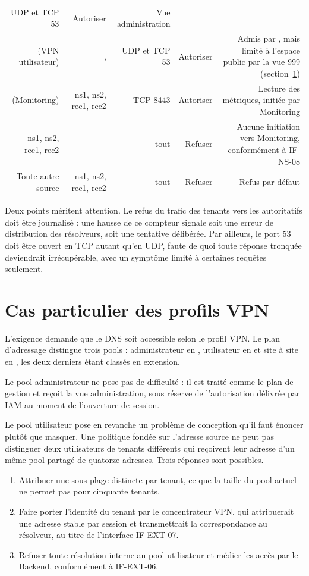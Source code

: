 \begin{longtable}{@{}R{0.26}R{0.19}R{0.14}R{0.13}R{0.28}@{}}
  UDP et TCP 53 & Autoriser & Vue administration\\
 (VPN utilisateur) & ,  &
  UDP et TCP 53 & Autoriser &
  Admis par , mais limité à l'espace public par la vue 999
  (section~\ref{sec:vpn})\\
 (Monitoring) & ns1, ns2, rec1, rec2 & TCP 8443 & Autoriser &
  Lecture des métriques, initiée par Monitoring\\
ns1, ns2, rec1, rec2 &  & tout & Refuser &
  Aucune initiation vers Monitoring, conformément à IF-NS-08\\
Toute autre source & ns1, ns2, rec1, rec2 & tout & Refuser &
  Refus par défaut\\
\end{longtable}

Deux points méritent attention. Le refus du trafic des tenants vers les
autoritatifs doit être journalisé : une hausse de ce compteur signale soit une
erreur de distribution des résolveurs, soit une tentative délibérée. Par
ailleurs, le port 53 doit être ouvert en TCP autant qu'en UDP, faute de quoi
toute réponse tronquée deviendrait irrécupérable, avec un symptôme limité à
certaines requêtes seulement.

\section{Cas particulier des profils VPN}
\label{sec:vpn}

L'exigence  demande que le DNS soit accessible selon le profil
VPN. Le plan d'adressage distingue trois pools : administrateur en
, utilisateur en  et site à site en
, les deux derniers étant classés en extension.

Le pool administrateur ne pose pas de difficulté : il est traité comme le plan
de gestion et reçoit la vue administration, sous réserve de l'autorisation
délivrée par IAM au moment de l'ouverture de session.

Le pool utilisateur pose en revanche un problème de conception qu'il faut
énoncer plutôt que masquer. Une politique fondée sur l'adresse source ne peut
pas distinguer deux utilisateurs de tenants différents qui reçoivent leur
adresse d'un même pool partagé de quatorze adresses. Trois réponses sont
possibles.

\begin{enumerate}
  \item Attribuer une sous-plage distincte par tenant, ce que la taille du pool
    actuel ne permet pas pour cinquante tenants.
  \item Faire porter l'identité du tenant par le concentrateur VPN, qui
    attribuerait une adresse stable par session et transmettrait la
    correspondance au résolveur, au titre de l'interface IF-EXT-07.
  \item Refuser toute résolution interne au pool utilisateur et médier les accès
    par le Backend, conformément à IF-EXT-06.
\end{enumerate}

